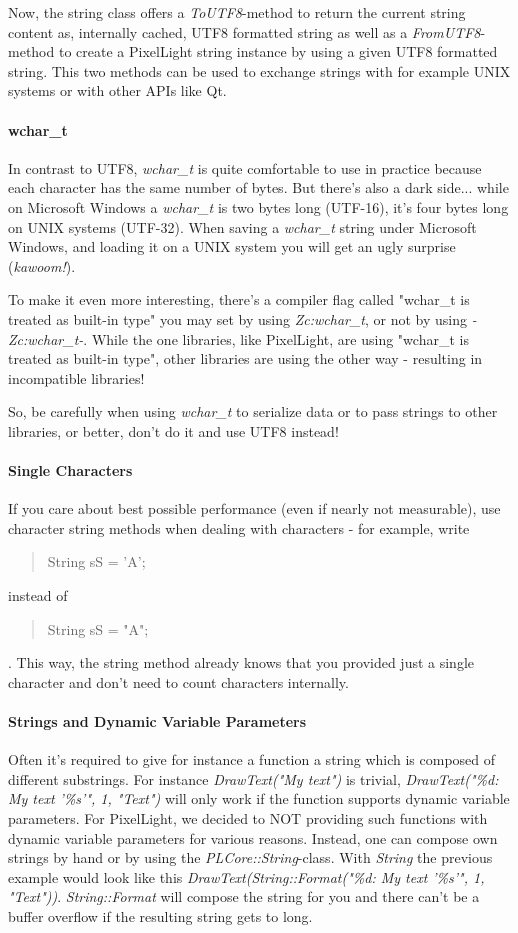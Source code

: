 Now, the string class offers a \emph{ToUTF8}-method to return the current string content as, internally cached, UTF8 formatted string as well as a \emph{FromUTF8}-method to create a PixelLight string instance by using a given UTF8 formatted string. This two methods can be used to exchange strings with for example UNIX systems or with other APIs like Qt.


\paragraph{wchar\_t}
In contrast to UTF8, \emph{wchar\_t} is quite comfortable to use in practice because each character has the same number of bytes. But there's also a dark side... while on Microsoft Windows a \emph{wchar\_t} is two bytes long (UTF-16), it's four bytes long on UNIX systems (UTF-32). When saving a \emph{wchar\_t} string under Microsoft Windows, and loading it on a UNIX system you will get an ugly surprise (\emph{kawoom!}).

To make it even more interesting, there's a compiler flag called "wchar\_t is treated as built-in type" you may set by using \emph{Zc:wchar\_t}, or not by using \emph{-Zc:wchar\_t-}. While the one libraries, like PixelLight, are using "wchar\_t is treated as built-in type", other libraries are using the other way - resulting in incompatible libraries!

So, be carefully when using \emph{wchar\_t} to serialize data or to pass strings to other libraries, or better, don't do it and use UTF8 instead!


\paragraph{Single Characters}
If you care about best possible performance (even if nearly not measurable), use character string methods when dealing with characters - for example, write \begin{quote}String sS = 'A';\end{quote} instead of \begin{quote}String sS = "A";\end{quote}. This way, the string method already knows that you provided just a single character and don't need to count characters internally.


\paragraph{Strings and Dynamic Variable Parameters}
Often it's required to give for instance a function a string which is composed of different substrings. For instance \emph{DrawText("My text")} is trivial, \emph{DrawText("\%d: My text '\%s'", 1, "Text")} will only work if the function supports dynamic variable parameters. For PixelLight, we decided to NOT providing such functions with dynamic variable parameters for various reasons. Instead, one can compose own strings by hand or by using the \emph{PLCore::String}-class. With \emph{String} the previous example would look like this \emph{DrawText(String::Format("\%d: My text '\%s'", 1, "Text"))}. \emph{String::Format} will compose the string for you and there can't be a buffer overflow if the resulting string gets to long.

